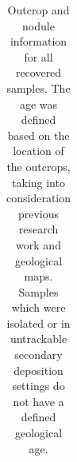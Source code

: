 \documentclass[
  a4paper,
  DIV=11,
  numbers=noendperiod]{scrreprt}
\begin{document}
\begin{figure}
\end{figure}%

\begin{longtable}[]{@{}
  >{\raggedright\arraybackslash}p{}
  >{\raggedright\arraybackslash}p{}
  >{\raggedright\arraybackslash}p{}
  >{\raggedright\arraybackslash}p{}
  >{\raggedright\arraybackslash}p{}
  >{\raggedright\arraybackslash}p{}
  >{\raggedright\arraybackslash}p{}
  >{\raggedright\arraybackslash}p{}@{}}

\caption{\label{tbl-frames-outcropdata}Outcrop and nodule information
for all recovered samples. The age was defined based on the location of
the outcrops, taking into consideration previous research work and
geological maps. Samples which were isolated or in untrackable secondary
deposition settings do not have a defined geological age.}

\tabularnewline


\end{longtable}
\end{document}
